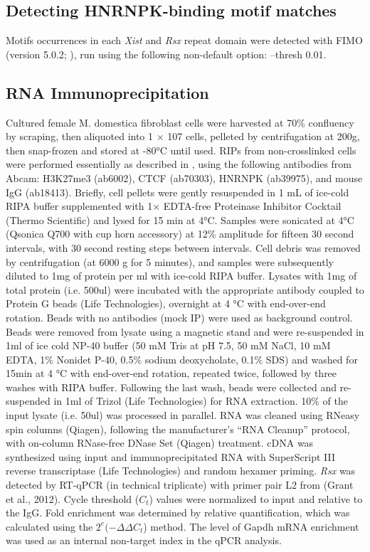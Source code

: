 \subsection{Detecting HNRNPK-binding motif matches}
Motifs occurrences in each \emph{Xist} and \emph{Rsx} repeat domain were detected with FIMO (version 5.0.2; \cite{Bailey2009MEMESearching}), run using the following non-default option: --thresh 0.01.

\subsection{RNA Immunoprecipitation}


Cultured female M. domestica fibroblast cells were harvested at 70\% confluency by scraping, then aliquoted into 1 × 107 cells, pelleted by centrifugation at 200g, then snap-frozen and stored at -80°C until used. RIPs from non-crosslinked cells were performed essentially as described in \cite{Zhao2008PolycombChromosome}, using the following antibodies from Abcam: H3K27me3 (ab6002), CTCF (ab70303), HNRNPK (ab39975), and mouse IgG (ab18413). Briefly, cell pellets were gently resuspended in 1 mL of ice-cold RIPA buffer supplemented with 1× EDTA-free Proteinase Inhibitor Cocktail (Thermo Scientific) and lysed for 15 min at 4°C. Samples were sonicated at 4°C (Qsonica Q700 with cup horn accessory) at 12\% amplitude for fifteen 30 second intervals, with 30 second resting steps between intervals. Cell debris was removed by centrifugation (at 6000 g for 5 minutes), and samples were subsequently diluted to 1mg of protein per ml with ice-cold RIPA buffer. Lysates with 1mg of total protein (i.e. 500ul) were incubated with the appropriate antibody coupled to Protein G beads (Life Technologies), overnight at 4 °C with end-over-end rotation. Beads with no antibodies (mock IP) were used as background control. Beads were removed from lysate using a magnetic stand and were re-suspended in 1ml of ice cold NP-40 buffer (50 mM Tris at pH 7.5, 50 mM NaCl, 10 mM EDTA, 1\% Nonidet P-40, 0.5\% sodium deoxycholate, 0.1\% SDS) and washed for 15min at 4 °C with end-over-end rotation, repeated twice, followed by three washes with RIPA buffer. Following the last wash, beads were collected and re-suspended in 1ml of Trizol (Life Technologies) for RNA extraction. 10\% of the input lysate (i.e. 50ul) was processed in parallel. RNA was cleaned using RNeasy spin columns (Qiagen), following the manufacturer's “RNA Cleanup” protocol, with on-column RNase-free DNase Set (Qiagen) treatment. cDNA was synthesized using input and immunoprecipitated RNA with SuperScript III reverse transcriptase (Life Technologies) and random hexamer priming. \emph{Rsx} was detected by RT-qPCR (in technical triplicate) with primer pair L2 from (Grant et al., 2012). Cycle threshold ($C_t$) values were normalized to input and relative to the IgG. Fold enrichment was determined by relative quantification, which was calculated using the $2^e(−\Delta\Delta C_t$) method. The level of Gapdh mRNA enrichment was used as an internal non-target index in the qPCR analysis.

